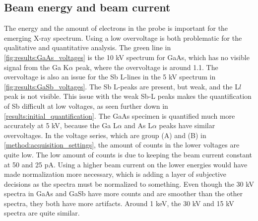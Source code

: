 




\subsection{Beam energy and beam current}
\label{results:beam_energy_and_beam_current}


The energy and the amount of electrons in the probe is important for the emerging X-ray spectrum.
Using a low overvoltage is both problematic for the qualitative and quantitative analysis.
The green line in \cref{fig:results:GaAs_voltages} is the 10 kV spectrum for GaAs, which has no visible signal from the Ga K$\alpha$ peak, where the overvoltage is around 1.1.
The overvoltage is also an issue for the Sb L-lines in the 5 kV spectrum in \cref{fig:results:GaSb_voltages}.
The Sb L-peaks are present, but weak, and the L$l$ peak is not visible.
This issue with the weak Sb-L peaks makes the quantification of Sb difficult at low voltages, as seen further down in \cref{results:initial_quantification}.
The GaAs specimen is quantified much more accurately at 5 kV, because the Ga L$\alpha$ and As L$\alpha$ peaks have similar overvoltages.
In the voltage series, which are group (A) and (B) in \cref{method:acquisition_settings}, the amount of counts in the lower voltages are quite low.
The low amount of counts is due to keeping the beam current constant at 50 and 25 pA.
Using a higher beam current on the lower energies would have made normalization more necessary, which is adding a layer of subjective decisions as the spectra must be normalized to something.
Even though the 30 kV spectra in GaAs and GaSb have more counts and are smoother than the other spectra, they both have more artifacts.
Around 1 keV, the 30 kV and 15 kV spectra are quite similar.


